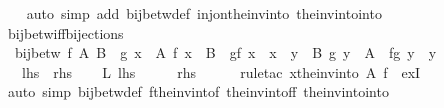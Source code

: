 \begin{isabellebody}
%
\isadelimproof
\ \ %
\endisadelimproof
%
\isatagproof
{}\isamarkupfalse%
\ {\isacharparenleft}{\kern0pt}auto\ simp\ add{\isacharcolon}{\kern0pt}\ bij{\isacharunderscore}{\kern0pt}betw{\isacharunderscore}{\kern0pt}def\ inj{\isacharunderscore}{\kern0pt}on{\isacharunderscore}{\kern0pt}the{\isacharunderscore}{\kern0pt}inv{\isacharunderscore}{\kern0pt}into\ the{\isacharunderscore}{\kern0pt}inv{\isacharunderscore}{\kern0pt}into{\isacharunderscore}{\kern0pt}into{\isacharparenright}{\kern0pt}%
\endisatagproof
{\isafoldproof}%
%
\isadelimproof
\isanewline
%
\endisadelimproof
\isanewline
{}\isamarkupfalse%
\ bij{\isacharunderscore}{\kern0pt}betw{\isacharunderscore}{\kern0pt}iff{\isacharunderscore}{\kern0pt}bijections{\isacharcolon}{\kern0pt}\isanewline
\ \ {\isachardoublequoteopen}bij{\isacharunderscore}{\kern0pt}betw\ f\ A\ B\ {\isasymlongleftrightarrow}\ {\isacharparenleft}{\kern0pt}{\isasymexists}g{\isachardot}{\kern0pt}\ {\isacharparenleft}{\kern0pt}{\isasymforall}x\ {\isasymin}\ A{\isachardot}{\kern0pt}\ f\ x\ {\isasymin}\ B\ {\isasymand}\ g{\isacharparenleft}{\kern0pt}f\ x{\isacharparenright}{\kern0pt}\ {\isacharequal}{\kern0pt}\ x{\isacharparenright}{\kern0pt}\ {\isasymand}\ {\isacharparenleft}{\kern0pt}{\isasymforall}y\ {\isasymin}\ B{\isachardot}{\kern0pt}\ g\ y\ {\isasymin}\ A\ {\isasymand}\ f{\isacharparenleft}{\kern0pt}g\ y{\isacharparenright}{\kern0pt}\ {\isacharequal}{\kern0pt}\ y{\isacharparenright}{\kern0pt}{\isacharparenright}{\kern0pt}{\isachardoublequoteclose}\isanewline
\ \ {\isacharparenleft}{\kern0pt}\ {\isachardoublequoteopen}{\isacharquery}{\kern0pt}lhs\ {\isacharequal}{\kern0pt}\ {\isacharquery}{\kern0pt}rhs{\isachardoublequoteclose}{\isacharparenright}{\kern0pt}\isanewline
%
\isadelimproof
%
\endisadelimproof
%
\isatagproof
{}\isamarkupfalse%
\isanewline
\ \ \isamarkupfalse%
\ L{\isacharcolon}{\kern0pt}\ {\isacharquery}{\kern0pt}lhs\isanewline
\ \ \isamarkupfalse%
\ \isamarkupfalse%
\ {\isacharquery}{\kern0pt}rhs\isanewline
\ \ \ \ \isamarkupfalse%
\ {\isacharparenleft}{\kern0pt}rule{\isacharunderscore}{\kern0pt}tac\ x{\isacharequal}{\kern0pt}{\isachardoublequoteopen}the{\isacharunderscore}{\kern0pt}inv{\isacharunderscore}{\kern0pt}into\ A\ f{\isachardoublequoteclose}\ \ exI{\isacharparenright}{\kern0pt}\isanewline
\ \ \ \ \isamarkupfalse%
\ {\isacharparenleft}{\kern0pt}auto\ simp{\isacharcolon}{\kern0pt}\ bij{\isacharunderscore}{\kern0pt}betw{\isacharunderscore}{\kern0pt}def\ f{\isacharunderscore}{\kern0pt}the{\isacharunderscore}{\kern0pt}inv{\isacharunderscore}{\kern0pt}into{\isacharunderscore}{\kern0pt}f\ the{\isacharunderscore}{\kern0pt}inv{\isacharunderscore}{\kern0pt}into{\isacharunderscore}{\kern0pt}f{\isacharunderscore}{\kern0pt}f\ the{\isacharunderscore}{\kern0pt}inv{\isacharunderscore}{\kern0pt}into{\isacharunderscore}{\kern0pt}into{\isacharparenright}{\kern0pt}\isanewline

\end{isabellebody}
